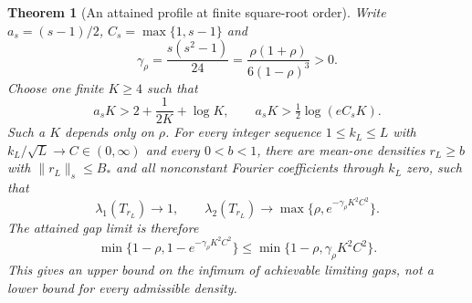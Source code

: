 \documentclass[11pt]{article}
\newtheorem{theorem}{Theorem}
\begin{document}
\begin{theorem}[An attained profile at finite square-root order]
\label{thm:332-finite-c}
Write $a_s=(s-1)/2$, $C_s=\max\{1,s-1\}$ and
\[
 \gamma_\rho=\frac{s(s^2-1)}{24}
            =\frac{\rho(1+\rho)}{6(1-\rho)^3}>0.
\]
Choose one finite $K\ge4$ such that
\begin{equation}\label{eq:332-margins}
 a_sK>2+\frac1{2K}+\log K,
 \qquad a_sK>\tfrac12\log(eC_sK).
\end{equation}
Such a $K$ depends only on $\rho$. For every integer sequence $1\le k_L\le L$ with
$k_L/\sqrt L\to C\in(0,\infty)$ and every $0<b<1$, there are mean-one
densities $r_L\ge b$ with $\|r_L\|_s\le B_*$ and all nonconstant
Fourier coefficients through $k_L$ zero, such that
\[
 \lambda_1(T_{r_L})\to1,\qquad
 \lambda_2(T_{r_L})\to\max\{\rho,e^{-\gamma_\rho K^2C^2}\}.
\]
The attained gap limit is therefore
\begin{equation}\label{eq:332-profile}
 \min\{1-\rho,1-e^{-\gamma_\rho K^2C^2}\}
 \le\min\{1-\rho,\gamma_\rho K^2C^2\}.
\end{equation}
This gives an upper bound on the infimum of achievable limiting gaps,
not a lower bound for every admissible density.
\end{theorem}
\end{document}
